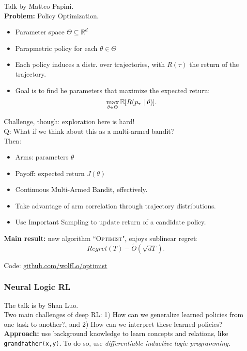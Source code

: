 Talk by Matteo Papini. \\

{\bf Problem:} Policy Optimization.
\begin{itemize}
    \item Parameter space $\Theta \subseteq \mathbb{R}^d$
    \item Parapmetric policy for each $\theta \in \Theta$
    \item Each policy induces a distr. over trajectories, with $R(\tau)$ the return of the trajectory.
    \item Goal is to find he parameters that maximize the expected return:
    \[
    \max_{\theta \in \Theta} \mathbb{E}[R(p_\tau \mid \theta)].
    \]
\end{itemize}

Challenge, though: exploration here is hard! \\

Q: What if we think about this as a multi-armed bandit? \\
Then:
\begin{itemize}
    \item Arms: parameters $\theta$
    \item Payoff: expected return $J(\theta)$
    \item Continuous Multi-Armed Bandit, effectively.
    \item Take advantage of arm correlation through trajectory distributions.
    \item Use Important Sampling to update return of a candidate policy.
\end{itemize}

{\bf Main result:} new algorithm ``\textsc{Optimist}", enjoys sublinear regret:
\[
Regret(T) - \tilde{O}(\sqrt{dT}).
\]

Code: \url{github.com/wolfLo/optimist} 

\spacerule

\subsubsection{Neural Logic RL}

The talk is by Shan Luo. \\

Two main challenges of deep RL: 1) How can we generalize learned policies from one task to another?, and 2) How can we interpret these learned policies? \\

{\bf Approach:} use background knowledge to learn concepts and relations, like \texttt{grandfather(x,y)}. To do so, use {\it differentiable inductive logic programming}.

